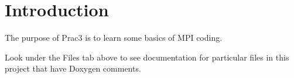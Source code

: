 \hypertarget{index_intro_sec}{}\section{Introduction}\label{index_intro_sec}
The purpose of Prac3 is to learn some basics of M\+PI coding.

Look under the Files tab above to see documentation for particular files in this project that have Doxygen comments. 